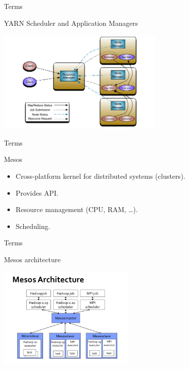 \begin{frame}{Terms}
  \begin{block}{YARN Scheduler and Application Managers}
    \begin{center}
      \includegraphics[height=5cm]{img/yarn.png}
    \end{center}
  \end{block}
\end{frame}

\begin{frame}{Terms}
  \begin{block}{Mesos}
    \begin{itemize}
      \item Cross-platform kernel for distributed systems (clusters).
      \item Provides API.
      \item Resource management (CPU, RAM, \dots).
      \item Scheduling.
    \end{itemize}
  \end{block}
\end{frame}

\begin{frame}{Terms}
  \begin{block}{Mesos architecture}
    \begin{center}
      \includegraphics[height=5cm]{img/mesos.jpg}
    \end{center}
  \end{block}
\end{frame}

